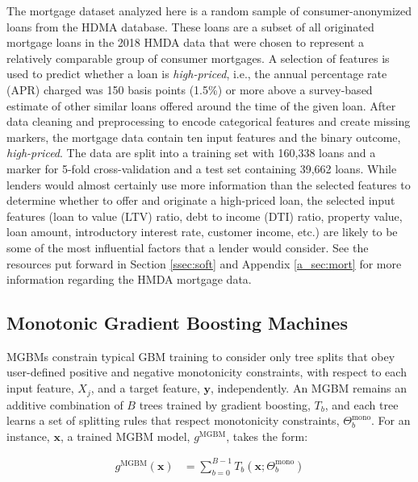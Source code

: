 \documentclass[information,article,accept,moreauthors,pdftex]{Definitions/mdpi}
\begin{document}
{{The mortgage dataset analyzed here is a random sample of consumer-anonymized loans from the HDMA database. These loans are a subset of all originated mortgage loans in the 2018 HMDA data that were chosen to represent a relatively comparable group of consumer mortgages.  A selection of features is used to predict whether a loan is \textit{high-priced}, i.e., the annual percentage rate (APR) charged was 150 basis points (1.5\%) or more above a survey-based estimate of other similar loans offered around the time of the given loan.  After data cleaning and preprocessing to encode categorical features and create missing markers, the mortgage data contain ten input features and the binary outcome, \textit{high-priced}. The data are split into a training set with 160,338 loans and a marker for 5-fold cross-validation and a test set containing 39,662 loans. While lenders would almost certainly use more information than the selected features to determine whether to offer and originate a high-priced loan, the selected input features (loan to value (LTV) ratio, debt to income (DTI) ratio, property value, loan amount, introductory interest rate, customer income, etc.) are likely to be some of the most influential factors that a lender would consider. See the resources put forward in Section \ref{ssec:soft} and Appendix \ref{a_sec:mort} for more information regarding the HMDA mortgage data.

\subsection{Monotonic Gradient Boosting Machines}\label{ssec:mgbm}

MGBMs constrain typical GBM training to consider only tree splits that obey user-defined positive and negative monotonicity constraints, with respect to each input feature, $X_j$, and a target feature, $\mathbf{y}$, independently. An MGBM remains an additive combination of $B$ trees trained by gradient boosting, $T_b$, and each tree learns a set of splitting rules that respect monotonicity constraints,  $\Theta^\text{mono}_b$. For an instance, $\mathbf{x}$, a trained MGBM model, $g^{\text{MGBM}}$, takes the form:

\begin{equation}
\begin{aligned}\label{eq:gbm}
g^{\text{MGBM}}(\mathbf{x}) &= \sum_{b=0}^{B-1} T_b\left(\mathbf{x}; \Theta^\text{mono}_b\right)
\end{aligned}
\end{equation}

}}
\end{document}
